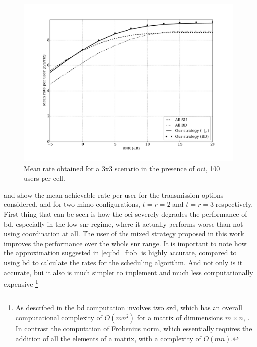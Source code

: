 \begin{figure}[t]
\centering
\includegraphics[width=0.75\columnwidth]{./12.simple_threshold_scheduling/img/mean_rate_03x03_100user_bd}
\caption{Mean rate obtained for a 3x3 scenario in the presence of \gls{oci}, 100
users per cell.}
\label{fig:mean_rate_3x3}
\end{figure}

 and  show the mean achievable
rate per user for the transmission options considered, and for two \gls{mimo}
configurations, $t=r=2$ and $t=r=3$ respectively. First thing that can be seen
is how the \gls{oci} severely degrades the performance of \gls{bd}, especially
in the low \gls{snr} regime, where it actually performs worse than not using
coordination at all. The user of the mixed strategy proposed in this work
improves the performance over the whole \gls{snr} range. It is important to note
how the approximation suggested in \eqref{eq:bd_frob} is highly accurate,
compared to using \gls{bd} to calculate the rates for the scheduling algorithm.
And not only is it accurate, but it also is much simpler to implement and much
less computationally expensive
\footnote{As described in  the \gls{bd} computation
involves two \gls{svd}, which has an overall computational complexity of
$O\left(mn^2\right)$ for a matrix of dimmensions $m \times n$,
\cite{golub2012matrix}. In contrast the computation of Frobenius norm, which
essentially requires the addition of all the elements of a matrix, with a
complexity of $O\left(mn\right)$.}

